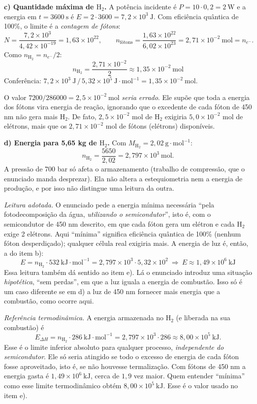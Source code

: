 \documentclass{article}%
\begin{document}
\medskip
\textbf{c) Quantidade máxima de $\text{H}_2$.} A potência incidente é $P=10\cdot0{,}2=2\ \text{W}$ e a energia em $t=3600\ \text{s}$ é $E=2\cdot3600=7{,}2\times10^{3}\ \text{J}$. Com eficiência quântica de 100\%, o limite é a \emph{contagem de fótons}:
\[
N=\frac{7{,}2\times10^{3}}{4{,}42\times10^{-19}}=1{,}63\times10^{22},
\qquad
n_{\text{fótons}}=\frac{1{,}63\times10^{22}}{6{,}02\times10^{23}}=2{,}71\times10^{-2}\ \text{mol}=n_{e^-}.
\]
Como $n_{\text{H}_2}=n_{e^-}/2$:
\[
n_{\text{H}_2}=\frac{2{,}71\times10^{-2}}{2}\approx \boxed{1{,}35\times10^{-2}\ \text{mol}}
\]
Conferência: $7{,}2\times10^{3}\ \text{J}\,/\,5{,}32\times10^{5}\ \text{J}\cdot\text{mol}^{-1}=1{,}35\times10^{-2}\ \text{mol}$.

O valor $7200/286000=2{,}5\times10^{-2}\ \text{mol}$ \emph{seria errado}. Ele supõe que toda a energia dos fótons vira energia de reação, ignorando que o excedente de cada fóton de 450 nm não gera mais $\text{H}_2$. De fato, $2{,}5\times10^{-2}$ mol de $\text{H}_2$ exigiria $5{,}0\times10^{-2}$ mol de elétrons, mais que os $2{,}71\times10^{-2}$ mol de fótons (elétrons) disponíveis.

\medskip
\textbf{d) Energia para 5,65 kg de $\text{H}_2$.} Com $M_{\text{H}_2}=2{,}02\ \text{g}\cdot\text{mol}^{-1}$:
\[
n_{\text{H}_2}=\frac{5650}{2{,}02}=2{,}797\times10^{3}\ \text{mol}.
\]
A pressão de 700 bar só afeta o armazenamento (trabalho de compressão, que o enunciado manda desprezar). Ela não altera a estequiometria nem a energia de produção, e por isso não distingue uma leitura da outra.

\emph{Leitura adotada.} O enunciado pede a energia mínima necessária ``pela fotodecomposição da água, \emph{utilizando o semicondutor}'', isto é, com o semicondutor de 450 nm descrito, em que cada fóton gera um elétron e cada $\text{H}_2$ exige 2 elétrons. Aqui ``mínima'' significa eficiência quântica de 100\% (nenhum fóton desperdiçado); qualquer célula real exigiria mais. A energia de luz é, então, a do item b):
\[
E=n_{\text{H}_2}\cdot 532\ \text{kJ}\cdot\text{mol}^{-1}=2{,}797\times10^{3}\cdot 5{,}32\times10^{2}\ \Rightarrow\ \boxed{E\approx 1{,}49\times10^{6}\ \text{kJ}}
\]
Essa leitura também dá sentido ao item e). Lá o enunciado introduz uma situação \emph{hipotética}, ``sem perdas'', em que a luz iguala a energia de combustão. Isso só é um caso diferente se em d) a luz de 450 nm fornecer mais energia que a combustão, como ocorre aqui.

\emph{Referência termodinâmica.} A energia armazenada no $\text{H}_2$ (e liberada na sua combustão) é
\[
E_{\Delta H}=n_{\text{H}_2}\cdot 286\ \text{kJ}\cdot\text{mol}^{-1}=2{,}797\times10^{3}\cdot286\approx 8{,}00\times10^{5}\ \text{kJ}.
\]
Esse é o limite inferior absoluto para qualquer processo, \emph{independente do semicondutor}. Ele só seria atingido se todo o excesso de energia de cada fóton fosse aproveitado, isto é, se não houvesse termalização. Com fótons de 450 nm a energia gasta é $1{,}49\times10^{6}\ \text{kJ}$, cerca de $1{,}9$ vez maior. Quem entender ``mínima'' como esse limite termodinâmico obtém $8{,}00\times10^{5}\ \text{kJ}$. Esse é o valor usado no item e).
\end{document}
